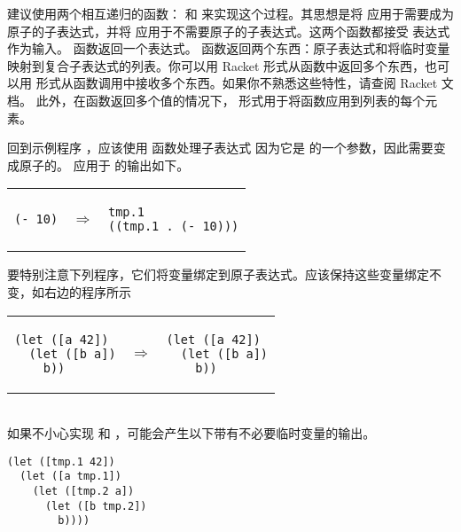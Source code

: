 \documentclass[11pt]{book}
\begin{document}
建议使用两个相互递归的函数： 和  来实现这个过程。其思想是将
 应用于需要成为原子的子表达式，并将  应用于不需要原子的子表达式。这两个函数都接受 \LangVar{} 表达式作为输入。  函数返回一个表达式。  函数返回两个东西：原子表达式和将临时变量映射到复合子表达式的列表。你可以用 Racket  形式从函数中返回多个东西，也可以用  形式从函数调用中接收多个东西。如果你不熟悉这些特性，请查阅 Racket 文档。
此外，在函数返回多个值的情况下，
\href{https://docs.racket-lang.org/reference/for.html#%28form._%28%28lib._racket%2Fprivate%2Fbase..rkt%29._for%2Flists%29%29}{\code{for/lists}}
  形式用于将函数应用到列表的每个元素。

回到示例程序  ，应该使用  函数处理子表达式  因为它是 \code{+} 的一个参数，因此需要变成原子的。
应用于  的输出如下。

\begin{tabular}{lll}
\begin{minipage}{0.4\textwidth}
\begin{lstlisting}
(- 10)
\end{lstlisting}
\end{minipage}
&
$\Rightarrow$
&
\begin{minipage}{0.4\textwidth}
\begin{lstlisting}
tmp.1
((tmp.1 . (- 10)))
\end{lstlisting}
\end{minipage}
\end{tabular}

要特别注意下列程序，它们将变量绑定到原子表达式。应该保持这些变量绑定不变，如右边的程序所示 \\
\begin{tabular}{lll}
\begin{minipage}{0.4\textwidth}
\begin{lstlisting}
(let ([a 42])
  (let ([b a])
    b))
\end{lstlisting}
\end{minipage}
&
$\Rightarrow$
&
\begin{minipage}{0.4\textwidth}
\begin{lstlisting}
(let ([a 42])
  (let ([b a])
    b))
\end{lstlisting}
\end{minipage}
\end{tabular} \\
如果不小心实现  和  ，可能会产生以下带有不必要临时变量的输出。\\
\begin{minipage}{0.4\textwidth}
\begin{lstlisting}
(let ([tmp.1 42])
  (let ([a tmp.1])
    (let ([tmp.2 a])
      (let ([b tmp.2])
        b))))
\end{lstlisting}
\end{minipage}
\end{document}
